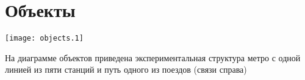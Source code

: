 \section{Объекты}

\texttt{[image: objects.1]}

На диаграмме объектов приведена экспериментальная структура метро с одной линией из пяти станций и путь одного из поездов (связи справа)
